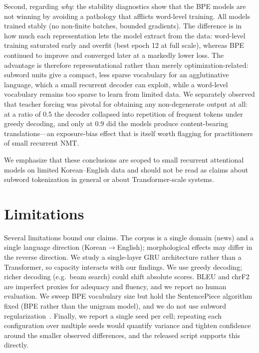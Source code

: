 \documentclass[conference]{IEEEtran}
\begin{document}
Second, regarding \emph{why}: the stability diagnostics show that the BPE models
are not winning by avoiding a pathology that afflicts word-level training. All
models trained stably (no non-finite batches, bounded gradients). The difference
is in how much each representation lets the model extract from the data:
word-level training saturated early and overfit (best epoch 12 at full scale),
whereas BPE continued to improve and converged later at a markedly lower loss.
The advantage is therefore representational rather than merely optimization-related:
subword units give a compact, less sparse vocabulary for an agglutinative
language, which a small recurrent decoder can exploit, while a word-level
vocabulary remains too sparse to learn from limited data. We separately observed
that teacher forcing was pivotal for obtaining any non-degenerate output at all:
at a ratio of 0.5 the decoder collapsed into repetition of frequent tokens under
greedy decoding, and only at 0.9 did the models produce content-bearing
translations---an exposure-bias effect that is itself worth flagging for
practitioners of small recurrent NMT.

We emphasize that these conclusions are scoped to small recurrent attentional
models on limited Korean--English data and should not be read as claims about
subword tokenization in general or about Transformer-scale systems.

\section{Limitations}
Several limitations bound our claims. The corpus is a single domain (news) and a
single language direction (Korean$\rightarrow$English); morphological effects may
differ in the reverse direction. We study a single-layer GRU architecture rather
than a Transformer, so capacity interacts with our findings. We use greedy
decoding; richer decoding (e.g.\ beam search) could shift absolute scores. BLEU
and chrF2 are imperfect proxies for adequacy and fluency, and we report no human
evaluation. We sweep BPE vocabulary size but hold the SentencePiece algorithm
fixed (BPE rather than the unigram model), and we do not use subword
regularization~\cite{kudo2018subword}. Finally, we report a single seed per cell;
repeating each configuration over multiple seeds would quantify variance and
tighten confidence around the smaller observed differences, and the released
script supports this directly.
\end{document}

